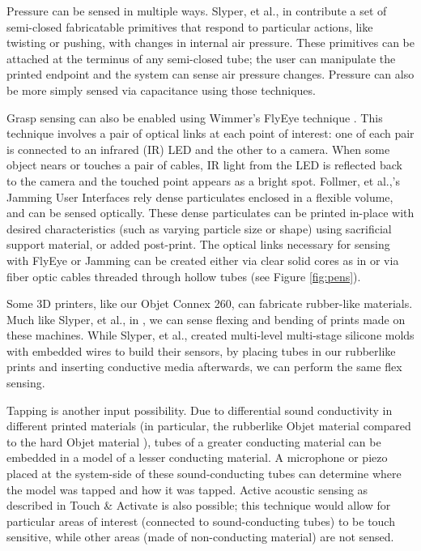 Pressure can be sensed in multiple ways.  Slyper, et al., in \cite{Slyper-pressure} contribute a set of semi-closed fabricatable primitives that respond to particular actions, like twisting or pushing, with changes in internal air pressure.    These primitives can be attached at the terminus of any semi-closed tube; the user can manipulate the printed endpoint and the system can sense air pressure changes.  Pressure can also be more simply sensed via capacitance using those techniques.

Grasp sensing can also be enabled using Wimmer's FlyEye technique \cite{Wimmer-flyeye}.  This technique involves a pair of optical links at each point of interest: one of each pair is connected to an infrared (IR) LED and the other to a camera.  When some object nears or touches a pair of cables, IR light from the LED is reflected back to the camera and the touched point appears as a bright spot.  Follmer, et al.,'s Jamming User Interfaces \cite{Follmer-jamming} rely dense particulates enclosed in a flexible volume, and can be sensed optically.  These dense particulates can be printed in-place with desired characteristics (such as varying particle size or shape) using sacrificial support material, or added post-print.  The optical links necessary for sensing with FlyEye or Jamming can be created either via clear solid cores as in \cite{Willis-printedoptics} or via fiber optic cables threaded through hollow tubes (see Figure \ref{fig:pens}).

Some 3D printers, like our Objet Connex 260, can fabricate rubber-like materials.  Much like Slyper, et al., in \cite{Slyper-shape}, we can sense flexing and bending of prints made on these machines.  While Slyper, et al., created multi-level multi-stage silicone molds with embedded wires to build their sensors, by placing tubes in our rubberlike prints and inserting conductive media afterwards, we can perform the same flex sensing.

Tapping is another input possibility.  Due to differential sound conductivity in different printed materials (in particular, the rubberlike Objet material compared to the hard Objet material ), tubes of a greater conducting material can be embedded in a model of a lesser conducting material.  A microphone or piezo placed at the system-side of these sound-conducting tubes can determine where the model was tapped and how it was tapped.  Active acoustic sensing as described in Touch \& Activate \cite{Ono-touchandactivate} is also possible; this technique would allow for particular areas of interest (connected to sound-conducting tubes) to be touch sensitive, while other areas (made of non-conducting material) are not sensed.

